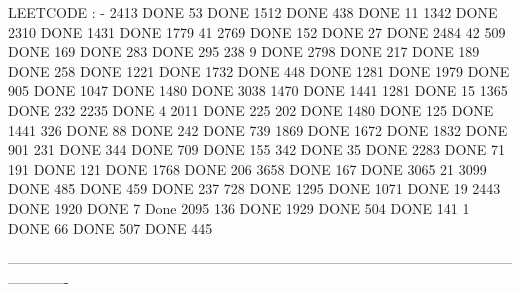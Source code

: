 LEETCODE : -
2413             DONE              53        DONE              1512         DONE              438     DONE                   11
1342             DONE              2310      DONE              1431         DONE              1779                      41       
2769             DONE              152       DONE              27           DONE              2484                      42      
509              DONE              169       DONE              283          DONE              295                       238
9                DONE              2798      DONE              217          DONE              189     DONE
258              DONE              1221      DONE              1732         DONE              448     DONE
1281             DONE              1979      DONE              905          DONE              1047    DONE
1480             DONE              3038                        1470         DONE              1441
1281             DONE              15                          1365         DONE              232
2235             DONE              4                           2011         DONE              225     
202              DONE              1480      DONE              125          DONE              1441
326              DONE              88        DONE              242          DONE              739
1869             DONE              1672      DONE              1832         DONE              901
231              DONE              344       DONE              709          DONE              155
342              DONE              35        DONE              2283         DONE              71
191              DONE              121       DONE              1768         DONE              206
3658             DONE              167       DONE              3065                           21
3099             DONE              485       DONE              459          DONE              237
728              DONE              1295      DONE              1071         DONE              19                                        
2443             DONE              1920      DONE              7            Done              2095
136              DONE              1929      DONE              504          DONE              141
1                DONE              66        DONE              507          DONE              445

-------------------------------------------------------------------------------------------------------------------------